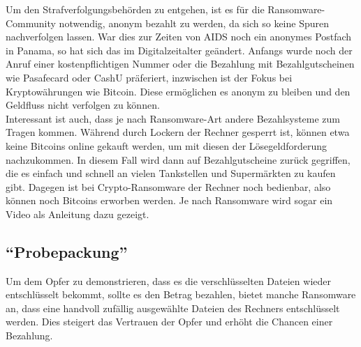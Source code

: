 Um den Strafverfolgungsbehörden zu entgehen, ist es für die Ransomware-Community notwendig, anonym bezahlt zu werden, da sich so keine Spuren nachverfolgen lassen. War dies zur Zeiten von AIDS noch ein anonymes Postfach in Panama, so hat sich das im Digitalzeitalter geändert. Anfangs wurde noch der Anruf einer kostenpflichtigen Nummer oder die Bezahlung mit Bezahlgutscheinen wie Pasafecard oder CashU präferiert, inzwischen ist der Fokus bei Kryptowährungen wie Bitcoin. Diese ermöglichen es anonym zu bleiben und den Geldfluss nicht verfolgen zu können.\\

Interessant ist auch, dass je nach Ransomware-Art andere Bezahlsysteme zum Tragen kommen. Während durch Lockern der Rechner gesperrt ist, können etwa keine Bitcoins online gekauft werden, um mit diesen der Lösegeldforderung nachzukommen. In diesem Fall wird dann auf Bezahlgutscheine zurück gegriffen, die es einfach und schnell an vielen Tankstellen und Supermärkten zu kaufen gibt. Dagegen ist bei Crypto-Ransomware der Rechner noch bedienbar, also können noch Bitcoins erworben werden. Je nach Ransomware wird sogar ein Video als Anleitung dazu gezeigt.

\subsection{"`Probepackung"'}

Um dem Opfer zu demonstrieren, dass es die verschlüsselten Dateien wieder entschlüsselt bekommt, sollte es den Betrag bezahlen, bietet manche Ransomware an, dass eine handvoll zufällig ausgewählte Dateien des Rechners entschlüsselt werden. Dies steigert das Vertrauen der Opfer und erhöht die Chancen einer Bezahlung.